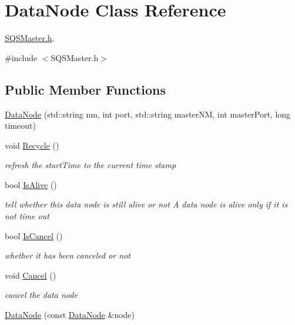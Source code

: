 \hypertarget{classDataNode}{\section{\-Data\-Node \-Class \-Reference}
\label{d7/d25/classDataNode}
}


\hyperlink{SQSMaster_8h}{\-S\-Q\-S\-Master.\-h}.  




{\ttfamily \#include $<$\-S\-Q\-S\-Master.\-h$>$}

\subsection*{\-Public \-Member \-Functions}
\begin{DoxyCompactItemize}
\item 
\hyperlink{classDataNode_ac068287608bac392bcacbcd331dcb61b}{\-Data\-Node} (std\-::string nm, int port, std\-::string master\-N\-M, int master\-Port, long timeout)
\item 
void \hyperlink{classDataNode_a3d27272bfc8151cb971b0ce383cc6051}{\-Recycle} ()
\begin{DoxyCompactList}\small\item\em refresh the start\-Time to the current time stamp \end{DoxyCompactList}\item 
bool \hyperlink{classDataNode_acd2015cb18b6f7b10f1d383f600cd159}{\-Is\-Alive} ()
\begin{DoxyCompactList}\small\item\em tell whether this data node is still alive or not \-A data node is alive only if it is not time out \end{DoxyCompactList}\item 
bool \hyperlink{classDataNode_a1c678740e9a4234d0af048d516887245}{\-Is\-Cancel} ()
\begin{DoxyCompactList}\small\item\em whether it has been canceled or not \end{DoxyCompactList}\item 
void \hyperlink{classDataNode_af7c18df11377f857c1d0b35c6569c184}{\-Cancel} ()
\begin{DoxyCompactList}\small\item\em cancel the data node \end{DoxyCompactList}\item 
\hyperlink{classDataNode_a4d9639b6295e5746af51ad24f2880095}{\-Data\-Node} (const \hyperlink{classDataNode}{\-Data\-Node} \&node)

\end{DoxyCompactItemize}
